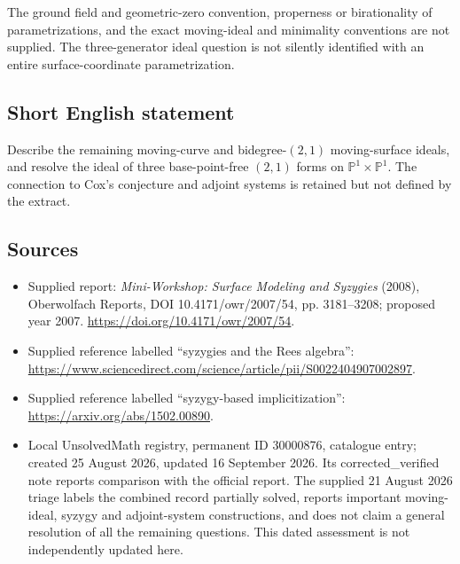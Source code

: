 \documentclass[11pt]{article}
\newcommand{\PP}{\mathbb{P}}
\begin{document}
The ground field and geometric-zero convention, properness or birationality of parametrizations, and the exact moving-ideal and minimality conventions are not supplied. The three-generator ideal question is not silently identified with an entire surface-coordinate parametrization.
\subsection{Short English statement}
Describe the remaining moving-curve and bidegree-$(2,1)$ moving-surface ideals, and resolve the ideal of three base-point-free $(2,1)$ forms on $\PP^1\times\PP^1$. The connection to Cox's conjecture and adjoint systems is retained but not defined by the extract.
\subsection{Sources}
\begin{itemize}
\item Supplied report: \emph{Mini-Workshop: Surface Modeling and Syzygies} (2008), Oberwolfach Reports, DOI 10.4171/owr/2007/54, pp. 3181--3208; proposed year 2007. \url{https://doi.org/10.4171/owr/2007/54}.
\item Supplied reference labelled ``syzygies and the Rees algebra'': \url{https://www.sciencedirect.com/science/article/pii/S0022404907002897}.
\item Supplied reference labelled ``syzygy-based implicitization'': \url{https://arxiv.org/abs/1502.00890}.
\item Local UnsolvedMath registry, permanent ID 30000876, catalogue entry; created 25 August 2026, updated 16 September 2026. Its corrected\_verified note reports comparison with the official report. The supplied 21 August 2026 triage labels the combined record partially solved, reports important moving-ideal, syzygy and adjoint-system constructions, and does not claim a general resolution of all the remaining questions. This dated assessment is not independently updated here.
\end{itemize}
\end{document}
